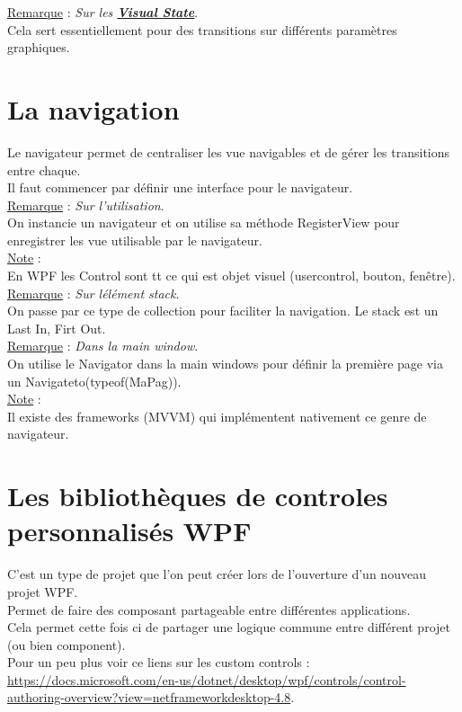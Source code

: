 \documentclass[a4paper,12pt,twoside]{article}
\newcommand{\urlcolor}{magenta}  %
\newcommand{\keycolor}{purple} %
\newcommand{\rem}[2]{\noindent\underline{Remarque} : \textit{#1}.\\ \indent #2}
\newcommand{\note}[1]{\noindent\underline{Note} : \\ \indent #1}
\newcommand{\keyref}[2]{\hypersetup{urlcolor=\keycolor} \href{#1}{\textbf{#2}}\hypersetup{urlcolor=\urlcolor}}
\begin{document}
\rem{Sur les \keyref{https://docs.microsoft.com/en-us/dotnet/api/system.windows.visualstate?view=windowsdesktop-6.0}{Visual State}}{Cela sert essentiellement pour des transitions sur différents paramètres graphiques.}\\



\section{La navigation}

Le navigateur permet de centraliser les vue navigables et de gérer les transitions entre chaque.\\
Il faut commencer par définir une interface pour le navigateur.\\

\rem{Sur l'utilisation}{On instancie un navigateur et on utilise sa méthode RegisterView pour enregistrer les vue utilisable par le navigateur.}\\

\note{En WPF les Control sont tt ce qui est objet visuel (usercontrol, bouton, fenêtre).}\\

\rem{Sur lélément stack}{On passe par ce type de collection pour faciliter la navigation. Le stack est un Last In, Firt Out.}\\

\rem{Dans la main window}{On utilise le Navigator dans la main windows pour définir la première page via un Navigateto(typeof(MaPag)).}\\

\note{Il existe des frameworks (MVVM) qui implémentent nativement ce genre de navigateur.}\\

\section{Les bibliothèques de controles personnalisés WPF}

C'est un type de projet que l'on peut créer lors de l'ouverture d'un nouveau projet WPF.\\
Permet de faire des composant partageable entre différentes applications.\\
Cela permet cette fois ci de partager une logique commune entre différent projet (ou bien component).\\
Pour un peu plus voir ce liens sur les custom controls : \url{https://docs.microsoft.com/en-us/dotnet/desktop/wpf/controls/control-authoring-overview?view=netframeworkdesktop-4.8}.\\
\end{document}
